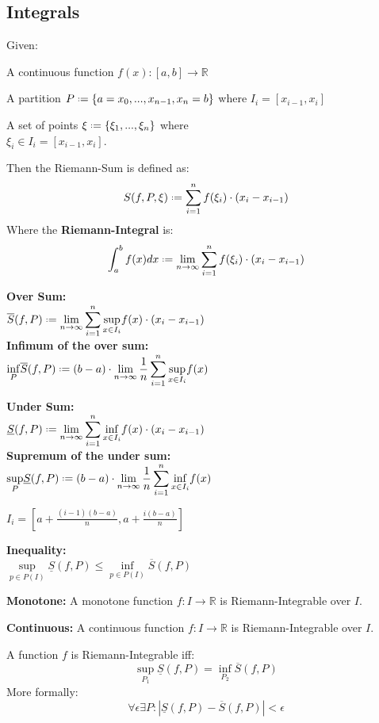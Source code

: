 \documentclass[8pt,a4paper]{extarticle}     %
\theoremstyle{definition}
\theoremstyle{definition}
\theoremstyle{definition}
\newcommand{\R}{\mathbb{R}}
\newcommand*{\defeq}{\mathrel{\vcenter{\baselineskip0.5ex \lineskiplimit0pt
            \hbox{\scriptsize.}\hbox{\scriptsize.}}}%
            =}
\begin{document}
\begin{multicols}{4}
\section{Integrals}
\begin{boxdefinition}
	Given:
	\begin{bulletlist}
		\item A continuous function $f(x): [a,b] \longrightarrow \R$
		\item A partition $P \defeq \{a=x_0,...,x_{n-1}, x_n=b\} $ where $I_i = [x_{i-1}, x_i]$
		\item A set of points $\xi \defeq \{\xi_1,...,\xi_n\}$ where \\$\xi_i\in I_i = [x_{i-1}, x_i]$.
	\end{bulletlist}
	Then the Riemann-Sum is defined as:
	$$S(f, P, \xi) \defeq \sum_{i=1}^n f(\xi_i) \cdot (x_i-x_{i-1})$$
	Where the \textbf{Riemann-Integral} is:
	$$\int_{a}^{b} f(x)dx \defeq \lim_{n\to\infty}\sum_{i=1}^n f(\xi_i) \cdot (x_i-x_{i-1})$$
\end{boxdefinition}
\begin{eqlist}
	\item \textbf{Over Sum:} \\
	$\displaystyle\overline{S}(f, P) \defeq \lim_{n\to\infty}\sum_{i=1}^n \underset{x\in I_i}{\sup}f(x) \cdot (x_i-x_{i-1})$\\
	\textbf{Infimum of the over sum:} \\
	$\displaystyle\underset{P}{\inf}\overline{S}(f, P) \defeq (b-a)\cdot\lim_{n\to\infty} \frac{1}{n} \sum_{i=1}^n \underset{x\in I_i}{\sup}f(x)$
	\item \textbf{Under Sum:} \\
	$\displaystyle\underline{S}(f, P) \defeq \lim_{n\to\infty}\sum_{i=1}^n \underset{x\in I_i}{\inf}f(x) \cdot (x_i-x_{i-1})$\\
	\textbf{Supremum of the under sum:} \\
	$\displaystyle\underset{P}{\sup}\underline{S}(f, P) \defeq (b-a)\cdot\lim_{n\to\infty} \frac{1}{n} \sum_{i=1}^n \underset{x\in I_i}{\inf}f(x)$
	\item[] $\displaystyle I_i = \left[a+\frac{(i-1)(b-a)}{n}, a+\frac{i(b-a)}{n}\right]$
	\item \textbf{Inequality:} \\
	$\underset{p\in P(I)}{\sup}\underline{S}(f, P) \leq \underset{p\in P(I)}{\inf}\overline{S}(f, P)$
	\item \textbf{Monotone:} A monotone function $f:I \rightarrow \R$ is Riemann-Integrable over $I$.
	\item \textbf{Continuous:} A continuous function $f:I \rightarrow \R$ is Riemann-Integrable over $I$.
\end{eqlist}
\begin{boxtheorem}
	A function $f$ is Riemann-Integrable iff:
	$$\underset{P_1}{\sup}\underline{S}(f, P) = \underset{P_2}{\inf}\overline{S}(f, P)$$
	More formally:
	$$\forall \epsilon \exists P: |\underline{S}(f, P) - \overline{S}(f, P)| < \epsilon$$


\end{boxtheorem}
\end{multicols}
\end{document}
